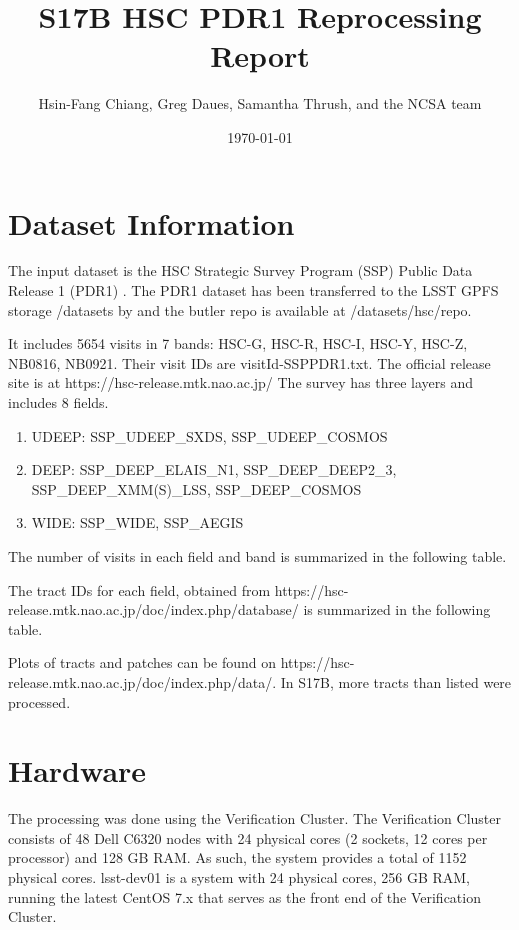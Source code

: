 \documentclass[DM,authoryear,toc]{lsstdoc}
\title{S17B HSC PDR1 Reprocessing Report}
\author{%
Hsin-Fang Chiang, Greg Daues, Samantha Thrush, and the NCSA team
}
\date{\today}
\begin{document}
\maketitle

\section{Dataset Information}
The input dataset is the HSC Strategic Survey Program (SSP) Public Data Release 1 (PDR1) \citep{2017arXiv170208449A}.
The PDR1 dataset has been transferred to the LSST GPFS storage /datasets by  and the butler repo is available at /datasets/hsc/repo.

It includes 5654 visits in 7 bands: HSC-G, HSC-R, HSC-I, HSC-Y, HSC-Z, NB0816, NB0921. Their visit IDs are visitId-SSPPDR1.txt.  The official release site is at https://hsc-release.mtk.nao.ac.jp/
The survey has three layers and includes 8 fields.
\begin{enumerate}
\item
UDEEP: SSP{\_}UDEEP{\_}SXDS, SSP{\_}UDEEP{\_}COSMOS
\item
DEEP: SSP{\_}DEEP{\_}ELAIS{\_}N1, SSP{\_}DEEP{\_}DEEP2{\_}3, SSP{\_}DEEP{\_}XMM(S){\_}LSS, SSP{\_}DEEP{\_}COSMOS
\item
WIDE: SSP{\_}WIDE, SSP{\_}AEGIS
\end{enumerate}

The number of visits in each field and band is summarized in the following table.



The tract IDs for each field, obtained
from https://hsc-release.mtk.nao.ac.jp/doc/index.php/database/
is summarized in the following table.



Plots of tracts and patches can be found on  https://hsc-release.mtk.nao.ac.jp/doc/index.php/data/. In S17B, more tracts than listed were processed.

\section{Hardware}
The processing was done using the Verification Cluster.
The Verification Cluster consists of 48 Dell C6320 nodes with 24 physical cores (2 sockets, 12 cores per processor) and 128 GB RAM. As such, the system provides a total of 1152 physical cores.
lsst-dev01 is a system with 24 physical cores, 256 GB RAM, running the latest CentOS 7.x that serves as the front end of the Verification Cluster.
\end{document}
